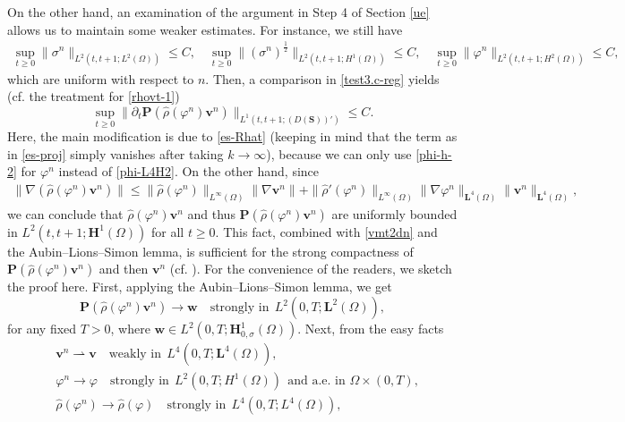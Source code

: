 \documentclass[11pt,reqno]{amsart}
\def\be{\begin{equation}}
\def\ee{\end{equation}}
\def\vv{\bm{v}}
\begin{document}
On the other hand, an examination of the argument in Step 4 of Section \ref{ue} allows us to maintain some weaker estimates. For instance, we still have
%
\begin{align}
 \sup_{t\geq 0}\|\sigma^n\|_{L^2(t,t+1;L^2(\Omega))}\leq C, \quad
 \sup_{t\geq 0}\|(\sigma^n)^\frac12\|_{L^2(t,t+1;H^1(\Omega))}\leq C, \quad
 \sup_{t\geq 0}\| \varphi^n\|_{L^2(t,t+1; H^2(\Omega))}\leq C,
 \label{lown-phi-sig}
\end{align}
%
which are uniform with respect to $n$. Then, a comparison in \eqref{test3.c-reg} yields (cf. the treatment for \eqref{rhovt-1})
\be
 \sup_{t\geq 0}\| \partial_{t} \bm{P}(\widehat{\rho}(\varphi^n)\bm{v}^{n})\|_{ L^{1}(t,t+1;(D(\bm{S}))')}
 \le C.
 \label{vmt2dn}
\ee
Here, the main modification is due to \eqref{es-Rhat} (keeping in mind that the term as in \eqref{es-proj} simply vanishes after taking $k\to \infty$), because we can only use \eqref{phi-h-2} for $\varphi^n$ instead of \eqref{phi-L4H2}. On the other hand, since
%
\begin{align*}
\|\nabla (\widehat{\rho}(\varphi^n)\vv^n)\|\leq  \|\widehat{\rho}(\varphi^n)\|_{L^\infty(\Omega)}\|\nabla \vv^n\| +
\|\widehat{\rho}'(\varphi^n)\|_{L^\infty(\Omega)}\|\nabla \varphi^n\|_{\bm{L}^4(\Omega)} \|\vv^n\|_{\bm{L}^4(\Omega)},
\end{align*}
%
we can conclude that $\widehat{\rho}(\varphi^n)\vv^n$ and thus $\bm{P}(\widehat{\rho}(\varphi^n)\vv^n)$ are uniformly bounded in $L^2(t,t+1;\bm{H}^1(\Omega))$ for all $t\geq 0$. This fact, combined with \eqref{vmt2dn} and the Aubin--Lions--Simon lemma, is sufficient for the strong compactness of $\bm{P}(\widehat{\rho}(\varphi^n)\bm{v}^{n})$ and then $\bm{v}^n$ (cf. \cite[Section 4.1]{Frigeri2021}). For the convenience of the readers, we sketch the proof here. First, applying the Aubin--Lions--Simon lemma, we get
%
\begin{equation*}
    \bm{P}(\widehat{\rho}(\varphi^n)\bm{v}^{n})\to \bm{w} \quad \text{strongly in} \ \ L^2(0,T;\bm{L}^2(\Omega)),
\end{equation*}
%
for any fixed $T>0$, where $\bm{w}\in L^2(0,T;\bm{H}^1_{0,\sigma}(\Omega))$. Next, from the easy facts
%
\begin{align*}
& \bm{v}^n \rightharpoonup \bm{v}\quad \text{weakly in}\ \ L^4(0,T;\bm{L}^4(\Omega)),\\
& \varphi^n\to \varphi \quad \text{strongly in}\ \ L^2(0,T;H^1(\Omega))\ \ \text{and a.e. in } \Omega\times (0,T),\\
& \widehat{\rho}(\varphi^n) \to \widehat{\rho}(\varphi) \quad \text{strongly in}\ \ L^4(0,T;L^4(\Omega)),
\end{align*}
\end{document}
